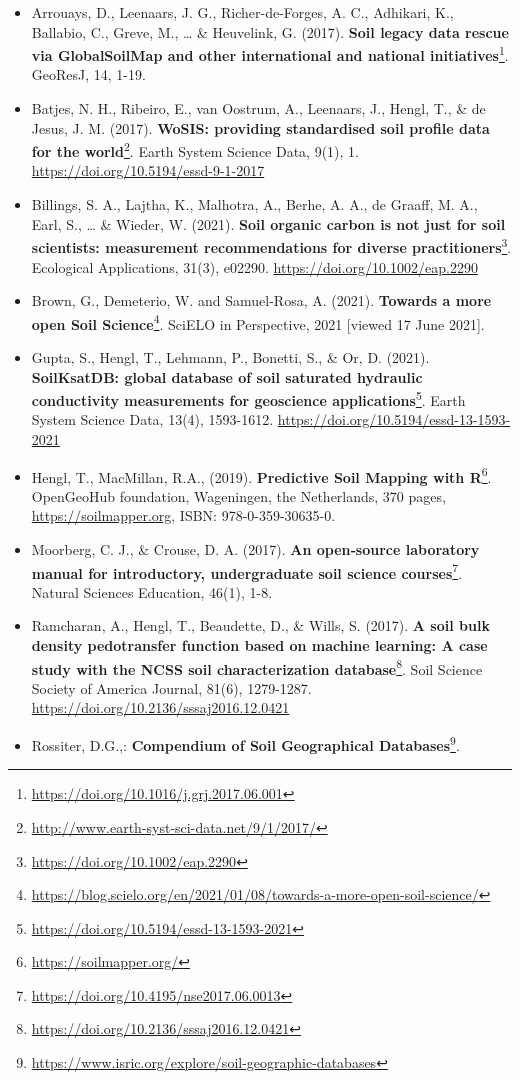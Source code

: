 \documentclass[
  graybox,natbib,nospthms]{svmono}
\providecommand{\tightlist}{%
  \setlength{\itemsep}{0pt}\setlength{\parskip}{0pt}}
\providecommand{\tightlist}{\setlength{\itemsep}{0pt}\setlength{\parskip}{0pt}}
\renewcommand{\href}[2]{#2 (\url{#1})}
\renewcommand{\href}[2]{#2\footnote{\url{#1}}}
\begin{document}
\begin{itemize}
\tightlist
\item
  Arrouays, D., Leenaars, J. G., Richer-de-Forges, A. C., Adhikari,
  K., Ballabio, C., Greve, M., \ldots{} \& Heuvelink, G. (2017). \href{https://doi.org/10.1016/j.grj.2017.06.001}{\textbf{Soil
  legacy data rescue via GlobalSoilMap and other international and
  national initiatives}}.
  GeoResJ, 14, 1-19.\\
\item
  Batjes, N. H., Ribeiro, E., van Oostrum, A., Leenaars, J., Hengl,
  T., \& de Jesus, J. M. (2017). \href{http://www.earth-syst-sci-data.net/9/1/2017/}{\textbf{WoSIS: providing standardised soil
  profile data for the world}}. Earth System Science Data, 9(1), 1. \url{https://doi.org/10.5194/essd-9-1-2017}~
\item
  Billings, S. A., Lajtha, K., Malhotra, A., Berhe, A. A., de Graaff, M. A.,
  Earl, S., \ldots{} \& Wieder, W. (2021). \href{https://doi.org/10.1002/eap.2290}{\textbf{Soil organic carbon is not just for soil
  scientists: measurement recommendations for diverse practitioners}}. Ecological Applications, 31(3), e02290. \url{https://doi.org/10.1002/eap.2290}\\
\item
  Brown, G., Demeterio, W. and Samuel-Rosa, A. (2021). \href{https://blog.scielo.org/en/2021/01/08/towards-a-more-open-soil-science/}{\textbf{Towards a more open Soil Science}}. SciELO in Perspective, 2021 {[}viewed 17 June 2021{]}.
\item
  Gupta, S., Hengl, T., Lehmann, P., Bonetti, S., \& Or, D. (2021). \href{https://doi.org/10.5194/essd-13-1593-2021}{\textbf{SoilKsatDB:
  global database of soil saturated hydraulic conductivity measurements for
  geoscience applications}}. Earth System Science Data, 13(4), 1593-1612.
  \url{https://doi.org/10.5194/essd-13-1593-2021}\\
\item
  Hengl, T., MacMillan, R.A., (2019). \href{https://soilmapper.org/}{\textbf{Predictive Soil Mapping with
  R}}. OpenGeoHub foundation, Wageningen, the
  Netherlands, 370 pages, \url{https://soilmapper.org}, ISBN:
  978-0-359-30635-0.\\
\item
  Moorberg, C. J., \& Crouse, D. A. (2017). \href{https://doi.org/10.4195/nse2017.06.0013}{\textbf{An open‐source laboratory manual for introductory, undergraduate soil science courses}}. Natural Sciences Education, 46(1), 1-8.\\
\item
  Ramcharan, A., Hengl, T., Beaudette, D., \& Wills, S. (2017). \href{https://doi.org/10.2136/sssaj2016.12.0421}{\textbf{A soil
  bulk density pedotransfer function based on machine learning: A case
  study with the NCSS soil characterization
  database}}. Soil Science
  Society of America Journal, 81(6), 1279-1287.
  \url{https://doi.org/10.2136/sssaj2016.12.0421}
\item
  Rossiter, D.G.,: \href{https://www.isric.org/explore/soil-geographic-databases}{\textbf{Compendium of Soil Geographical
  Databases}}.
\end{itemize}
\end{document}
